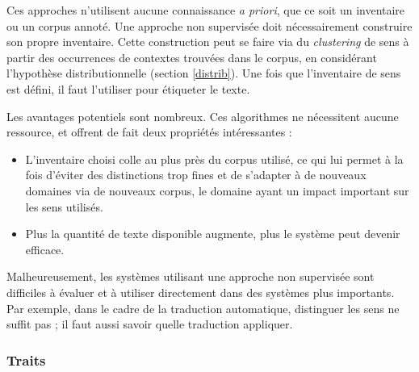 Ces approches n'utilisent aucune connaissance \textit{a priori}, que ce soit un
inventaire ou un corpus annoté. Une approche non supervisée doit nécessairement
construire son propre inventaire. Cette construction peut se faire via du
\textit{clustering} de sens à partir des occurrences de contextes trouvées dans
le corpus, en considérant l'hypothèse distributionnelle (section
\ref{distrib}). Une fois que l'inventaire de sens est défini, il faut
l'utiliser pour étiqueter le texte.

Les avantages potentiels sont nombreux. Ces algorithmes ne nécessitent aucune
ressource, et offrent de fait deux propriétés intéressantes :

\begin{itemize}

    \item L'inventaire choisi colle au plus près du corpus utilisé, ce qui lui
        permet à la fois d'éviter des distinctions trop fines et de s'adapter à
        de nouveaux domaines via de nouveaux corpus, le domaine ayant un impact
        important sur les sens utilisés.

    \item Plus la quantité de texte disponible augmente, plus le système peut
        devenir efficace.

\end{itemize}

Malheureusement, les systèmes utilisant une approche non supervisée sont
difficiles à évaluer et à utiliser directement dans des systèmes plus
importants. Par exemple, dans le cadre de la traduction automatique, distinguer
les sens ne suffit pas ; il faut aussi savoir quelle traduction appliquer.

\subsubsection{Traits}

